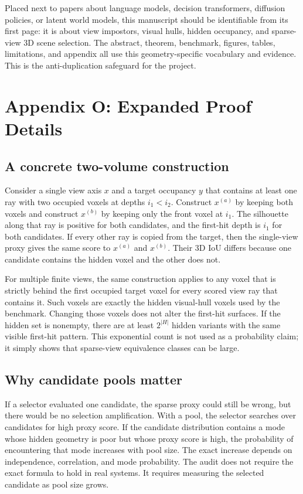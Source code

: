 \documentclass{article}
\begin{document}
Placed next to papers about language models, decision transformers, diffusion
policies, or latent world models, this manuscript should be identifiable from
its first page: it is about view impostors, visual hulls, hidden occupancy, and
sparse-view 3D scene selection. The abstract, theorem, benchmark, figures,
tables, limitations, and appendix all use this geometry-specific vocabulary and
evidence. This is the anti-duplication safeguard for the project.

\section{Appendix O: Expanded Proof Details}

\subsection{A concrete two-volume construction}

Consider a single view axis $x$ and a target occupancy $y$ that contains at
least one ray with two occupied voxels at depths $i_1<i_2$. Construct
$x^{(a)}$ by keeping both voxels and construct $x^{(b)}$ by keeping only the
front voxel at $i_1$. The silhouette along that ray is positive for both
candidates, and the first-hit depth is $i_1$ for both candidates. If every
other ray is copied from the target, then the single-view proxy gives the same
score to $x^{(a)}$ and $x^{(b)}$. Their 3D IoU differs because one candidate
contains the hidden voxel and the other does not.

For multiple finite views, the same construction applies to any voxel that is
strictly behind the first occupied target voxel for every scored view ray that
contains it. Such voxels are exactly the hidden visual-hull voxels used by the
benchmark. Changing those voxels does not alter the first-hit surfaces. If the
hidden set is nonempty, there are at least $2^{|H|}$ hidden variants with the
same visible first-hit pattern. This exponential count is not used as a
probability claim; it simply shows that sparse-view equivalence classes can be
large.

\subsection{Why candidate pools matter}

If a selector evaluated one candidate, the sparse proxy could still be wrong,
but there would be no selection amplification. With a pool, the selector
searches over candidates for high proxy score. If the candidate distribution
contains a mode whose hidden geometry is poor but whose proxy score is high,
the probability of encountering that mode increases with pool size. The exact
increase depends on independence, correlation, and mode probability. The audit
does not require the exact formula to hold in real systems. It requires
measuring the selected candidate as pool size grows.
\end{document}
